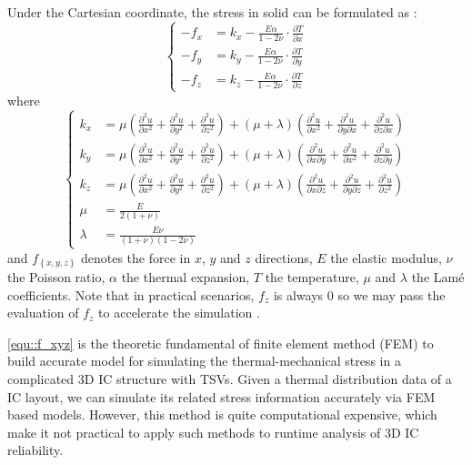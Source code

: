 Under the Cartesian coordinate, the stress in solid can be formulated as \cite{Chen2013Numerical}:
\begin{equation} \label{equ::f_xyz}
\left\{
    \begin{array}{rl}
    -f_x &={} k_x - \frac{E\alpha}{1-2\nu}\cdot\frac{\partial T}{\partial x} \\
    -f_y &={} k_y - \frac{E\alpha}{1-2\nu}\cdot\frac{\partial T}{\partial y} \\
    -f_z &={} k_z - \frac{E\alpha}{1-2\nu}\cdot\frac{\partial T}{\partial z}
    \end{array}
\right.
\end{equation}
where
\begin{equation*}
\left\{
    \begin{array}{rl}
    k_x &= \mu \left( \frac{\partial^2u}{\partial x^2} + \frac{\partial^2u}{\partial y^2} + \frac{\partial^2u}{\partial z^2} \right) 
          + \left( \mu + \lambda \right) \left( \frac{\partial^2u}{\partial x^2} + \frac{\partial^2u}{\partial y \partial x} + \frac{\partial^2u}{\partial z\partial x} \right) \\
    k_y &= \mu \left( \frac{\partial^2u}{\partial x^2} + \frac{\partial^2u}{\partial y^2} + \frac{\partial^2u}{\partial z^2} \right) 
          + \left( \mu + \lambda \right) \left( \frac{\partial^2u}{\partial x \partial y} + \frac{\partial^2u}{\partial x^2} + \frac{\partial^2u}{\partial z\partial y} \right) \\
    k_z &= \mu \left( \frac{\partial^2u}{\partial x^2} + \frac{\partial^2u}{\partial y^2} + \frac{\partial^2u}{\partial z^2} \right) 
          + \left( \mu + \lambda \right) \left( \frac{\partial^2u}{\partial x \partial z} + \frac{\partial^2u}{\partial y \partial z} + \frac{\partial^2u}{\partial z^2} \right) \\
    \mu &= \frac{E}{2(1+\nu)} \\
    \lambda &= \frac{E\nu}{(1+\nu)(1-2\nu)}
    \end{array}
\right.
\end{equation*}
and $f_{\left\{ x,y,z \right\}}$ denotes the force in $x$, $y$ and $z$ directions, $E$ the elastic
modulus, $\nu$ the Poisson ratio, $\alpha$ the thermal expansion, $T$ the temperature, $\mu$ and
$\lambda$ the Lam\'e coefficients. Note that in practical scenarios, $f_z$ is always $0$ so we may
pass the evaluation of $f_z$ to accelerate the simulation \cite{Marella2015A}.

\ref{equ::f_xyz} is the theoretic fundamental of finite element method (FEM) to build accurate model for simulating the
thermal-mechanical stress in a complicated 3D IC structure with TSVs. Given a thermal distribution
data of a IC layout, we can simulate its related stress information accurately via FEM based models.
However, this method is quite computational expensive, which make it not practical to apply
such methods to runtime analysis of 3D IC reliability.

